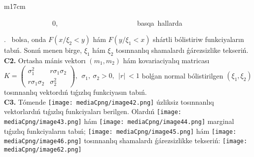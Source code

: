 \documentclass{article}
\begin{document}
\begin{tabular}{m{17cm}}
\begin{matrix}
\ \ \ \ \ \ \ \ \ \ \ \ \ \ 0,\ \ \ \ \ \ \ \ \ \ \ \ \ \ \ \ \ \ \ \ \ \ \ basqa\ hallarda
\end{matrix} \right.\ \) bolsa, onda \(F\left( x/\xi_{2} < y \right)\) hám \(F\left( y/\xi_{1} < x \right)\) shártli bólistiriw funkciyaların tabıń. Sonıń menen birge, \(\xi_{1}\) hám \(\xi_{2}\) tosınnanlıq shamalardı ǵárezsizlike tekseriń.
 \\
\textbf{C2.} Ortasha mánis vektorı \(\left( m_{1},m_{2} \right)\) hám kovariaciyalıq matricası\(K = \begin{pmatrix}
\sigma_{1}^{2} & r\sigma_{1}\sigma_{2} \\
r\sigma_{1}\sigma_{2} & \sigma_{2}^{2}
\end{pmatrix},\ \ \sigma_{1},\ \sigma_{2} > 0,\ \ |r|\  < 1\) bolǵan normal bólistirilgen \(\left( \xi_{1},\xi_{2} \right)\) tosınnanlıq vektordıń tıǵızlıq funkciyasın tabıń.
 \\
\textbf{C3.} Tómende \texttt{[image: mediaCpng/image42.png]} úzliksiz tosınnanlıq vektorlardıń tıǵızlıq funkciyaları berilgen. Olardıń \texttt{[image: mediaCpng/image43.png]} hám \texttt{[image: mediaCpng/image44.png]} marginal tıǵızlıq funkciyaların tabıń; \texttt{[image: mediaCpng/image45.png]} hám \texttt{[image: mediaCpng/image46.png]} tosınnanlıq shamalardı ǵárezsizlikke tekseriń: \texttt{[image: mediaCpng/image62.png]}
 \\

\end{tabular}
\vspace{1cm}
\end{document}
